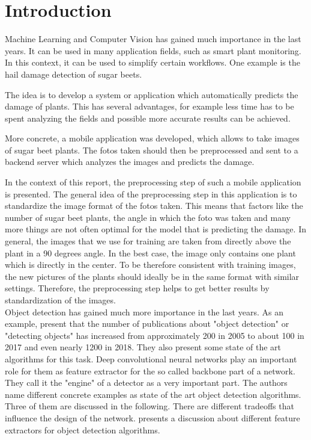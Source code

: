 
\chapter{Introduction}

Machine Learning and Computer Vision has gained much importance in the last years. It can be used in many application fields, such as smart plant monitoring. In this context, it can be used to simplify certain workflows. One example is the hail damage detection of sugar beets. 

The idea is to develop a system or application which automatically predicts the damage of plants. This has several advantages, for example less time has to be spent analyzing the fields and possible more accurate results can be achieved. 

More concrete, a mobile application was developed, which allows to take images of sugar beet plants. The fotos taken should then be preprocessed and sent to a backend server which analyzes the images and predicts the damage. 

In the context of this report, the preprocessing step of such a mobile application is presented. The general idea of the preprocessing step in this application is to standardize the image format of the fotos taken. This means that factors like the number of sugar beet plants, the angle in which the foto was taken and many more things are not often optimal for the model that is predicting the damage. In general, the images that we use for training are taken from directly above the plant in a 90 degrees angle. In the best case, the image only contains one plant which is directly in the center. To be therefore consistent with training images, the new pictures of the plants should ideally be in the same format with similar settings. Therefore, the preprocessing step helps to get better results by standardization of the images. \\

Object detection has gained much more importance in the last years. As an example, \cite{object_detection_history} present that the number of publications about "object detection" or "detecting objects" has increased from approximately 200 in 2005 to about 100 in 2017 and even nearly 1200 in 2018. They also present some state of the art algorithms for this task. Deep convolutional neural networks play an important role for them as feature extractor for the so called backbone part of a network. They call it the "engine" of a detector as a very important part. The authors name different concrete examples as state of the art object detection algorithms. Three of them are discussed in the following. There are different tradeoffs that influence the design of the network. \cite{discussion_engines} presents a discussion about different feature extractors for object detection algorithms.

